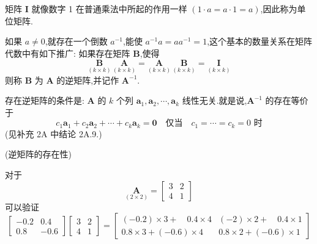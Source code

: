 矩阵 $\bm{I}$ 就像数字 1 在普通乘法中所起的作用一样 $(1\cdot a=a\cdot 1=a)$,因此称为单位矩阵.

如果 $a\neq 0$,就存在一个倒数 $a^{-1}$,能使 $a^{-1}a=aa^{-1}=1$,这个基本的数量关系在矩阵代数中有如下推广: 如果存在矩阵 $\bm{B}$,使得
\[
\underset{(k\times k)}{\bm{B}}\,\underset{(k\times k)}{\bm{A}} = \underset{(k\times k)}{\bm{A}}\,\underset{(k\times k)}{\bm{B}} = \underset{(k\times k)}{\bm{I}}
\]
则称 $\bm{B}$ 为 $\bm{A}$ 的逆矩阵,并记作 $\bm{A}^{-1}$.

存在逆矩阵的条件是: $\bm{A}$ 的 $k$ 个列 $\bm{a}_1,\bm{a}_2,\cdots,\bm{a}_k$ 线性无关.就是说,$\bm{A}^{-1}$ 的存在等价于
\label{eq:2-12}
\begin{equation}
c_1\bm{a}_1 + c_2\bm{a}_2 + \cdots + c_k\bm{a}_k = \bm{0} \quad\text{仅当}\quad c_1 = \cdots = c_k = 0 \text{ 时} \tag{2-12}
\end{equation}
(见补充 2A 中结论 2A.9.)

\quad (逆矩阵的存在性)

对于
\[
\underset{(2\times 2)}{\bm{A}} =
\begin{bmatrix}
3 & 2 \\
4 & 1
\end{bmatrix}
\]
可以验证
\[
\begin{bmatrix}
-0.2 & 0.4 \\
0.8 & -0.6
\end{bmatrix}
\begin{bmatrix}
3 & 2 \\
4 & 1
\end{bmatrix}
=
\begin{bmatrix}
(-0.2)\times 3 + \quad 0.4\times 4 & (-2)\times 2 + \quad 0.4\times 1 \\
0.8\times 3+(-0.6)\times 4 & 0.8\times 2+(-0.6)\times 1
\end{bmatrix}
\]
